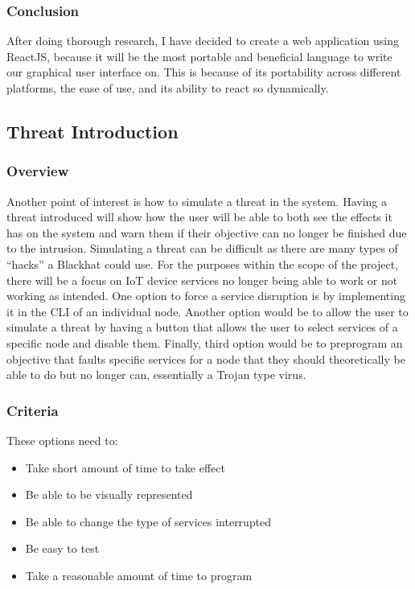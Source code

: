 \documentclass[draftclsnofoot, onecolumn, compsoc, 10pt]{IEEEtran}
\begin{document}
\subsubsection{Conclusion}
After doing thorough research, I have decided to create a web application using ReactJS, because it will be the most portable and beneficial language to write our graphical user interface on. This is because of its portability across different platforms, the ease of use, and its ability to react so dynamically.

\subsection{Threat Introduction}
\subsubsection{Overview}
Another point of interest is how to simulate a threat in the system. Having a threat introduced  will show how the user will be able to both see the effects it has on the system and warn them if their objective can no longer be finished due to the intrusion. Simulating a threat can be difficult as there are many types of “hacks” a Blackhat could use. For the purposes within the scope of the project, there will be a focus on IoT device services no longer being able to work or not working as intended. One option to force a service disruption is by implementing it in the CLI of an individual node. Another option would be to allow the user to simulate a threat by having a button that allows the user to select services of a specific node and disable them. Finally, third option would be to preprogram an objective that faults specific services for a node that they should theoretically be able to do but no longer can, essentially a Trojan type virus. 
\subsubsection{Criteria}
These options need to:
\begin{itemize}
    \item Take short amount of time to take effect
    \item Be able to be visually represented
    \item Be able to change the type of services interrupted
    \item Be easy to test
    \item Take a reasonable amount of time to program
\end{itemize}
\end{document}
